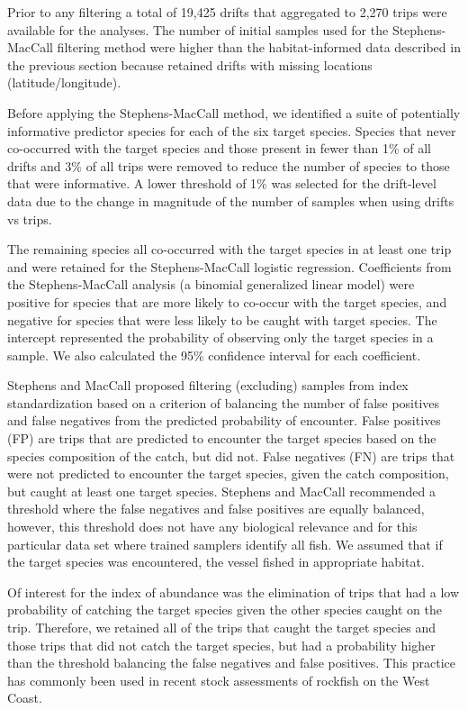 \documentclass[
  12pt,
  authoryear,
  preprint,
  3p]{elsarticle}
\begin{document}
Prior to any filtering a total of 19,425 drifts that aggregated to 2,270
trips were available for the analyses. The number of initial samples
used for the Stephens-MacCall filtering method were higher than the
habitat-informed data described in the previous section because retained
drifts with missing locations (latitude/longitude).

Before applying the Stephens-MacCall method, we identified a suite of
potentially informative predictor species for each of the six target
species. Species that never co-occurred with the target species and
those present in fewer than 1\% of all drifts and 3\% of all trips were
removed to reduce the number of species to those that were informative.
A lower threshold of 1\% was selected for the drift-level data due to
the change in magnitude of the number of samples when using drifts vs
trips.

The remaining species all co-occurred with the target species in at
least one trip and were retained for the Stephens-MacCall logistic
regression. Coefficients from the Stephens-MacCall analysis (a binomial
generalized linear model) were positive for species that are more likely
to co-occur with the target species, and negative for species that were
less likely to be caught with target species. The intercept represented
the probability of observing only the target species in a sample. We
also calculated the 95\% confidence interval for each coefficient.

Stephens and MacCall proposed filtering (excluding) samples from index
standardization based on a criterion of balancing the number of false
positives and false negatives from the predicted probability of
encounter. False positives (FP) are trips that are predicted to
encounter the target species based on the species composition of the
catch, but did not. False negatives (FN) are trips that were not
predicted to encounter the target species, given the catch composition,
but caught at least one target species. Stephens and MacCall recommended
a threshold where the false negatives and false positives are equally
balanced, however, this threshold does not have any biological relevance
and for this particular data set where trained samplers identify all
fish. We assumed that if the target species was encountered, the vessel
fished in appropriate habitat.

Of interest for the index of abundance was the elimination of trips that
had a low probability of catching the target species given the other
species caught on the trip. Therefore, we retained all of the trips that
caught the target species and those trips that did not catch the target
species, but had a probability higher than the threshold balancing the
false negatives and false positives. This practice has commonly been
used in recent stock assessments of rockfish on the West Coast.
\end{document}
